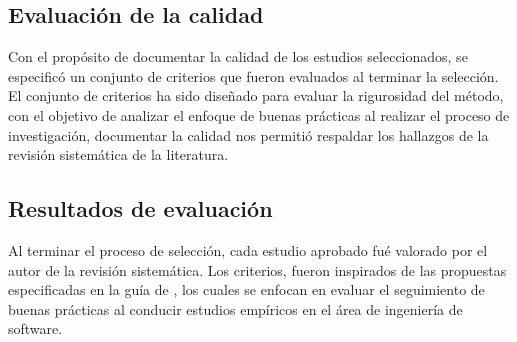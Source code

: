 \documentclass[conference,onecolumn,10pt]{IEEEtran}
\begin{document}
\subsection{Evaluación de la calidad}

Con el propósito de documentar la calidad de los estudios seleccionados, 
se especificó un conjunto de criterios que fueron evaluados al terminar la 
selección.
El conjunto de criterios ha sido diseñado para evaluar la rigurosidad del método, 
con el objetivo de analizar el enfoque de buenas prácticas al realizar el proceso de 
investigación, documentar la calidad nos permitió respaldar los hallazgos de la 
revisión sistemática de la literatura. 


\begin{table}[ht]
        \caption{Criterios para evaluar} 
        \centering 
        \label{table:tablaterminos}
\end{table}


\subsection{Resultados de evaluación}
Al terminar el proceso de selección, cada estudio aprobado fué valorado por el autor de la revisión sistemática.
Los criterios, fueron inspirados de las propuestas especificadas en la guía de \cite{kitchenham2007guidelines}, 
los cuales se enfocan en evaluar el seguimiento de buenas prácticas al conducir estudios empíricos en el área 
de ingeniería de software.
\end{document}
